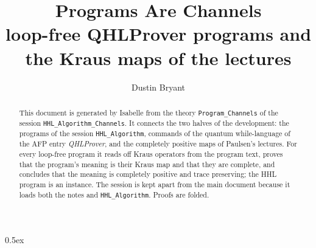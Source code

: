 \documentclass[11pt,a4paper]{article}
\begin{document}
\title{Programs Are Channels\\[0.5em]
  \large loop-free QHLProver programs and the Kraus maps of the lectures}
\author{Dustin Bryant}
\maketitle

\begin{abstract}
This document is generated by Isabelle from the theory \texttt{Program\_Channels} of the session
\texttt{HHL\_Algorithm\_Channels}.  It connects the two halves of the development: the programs
of the session \texttt{HHL\_Algorithm}, commands of the quantum while-language of the AFP entry \emph{QHLProver}, and the
completely positive maps of Paulsen's lectures.  For every loop-free program it reads off Kraus
operators from the program text, proves that the program's meaning is their Kraus map and that
they are complete, and concludes that the meaning is completely positive and trace preserving;
the HHL program is an instance.  The session is kept apart from the main document because it
loads both the notes and \texttt{HHL\_Algorithm}.  Proofs are folded.
\end{abstract}

\parindent 0pt\parskip 0.5ex


\end{document}

